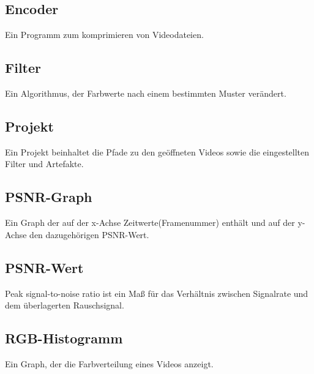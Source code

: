 \documentclass[parskip=full]{scrartcl}
\begin{document}
\subsection*{Encoder} 
Ein Programm zum komprimieren von Videodateien.
\subsection*{Filter} 
Ein Algorithmus, der Farbwerte nach einem bestimmten Muster verändert.
\subsection*{Projekt} 
Ein Projekt beinhaltet die Pfade zu den geöffneten Videos sowie die eingestellten Filter und Artefakte.
\subsection*{PSNR-Graph} 
Ein Graph der auf der x-Achse Zeitwerte(Framenummer) enthält und auf der y-Achse den dazugehörigen PSNR-Wert.
\subsection*{PSNR-Wert} 
Peak signal-to-noise ratio ist ein Maß für das Verhältnis zwischen Signalrate und dem überlagerten Rauschsignal.
\subsection*{RGB-Histogramm} 
Ein Graph, der die Farbverteilung eines Videos anzeigt.
\end{document}
